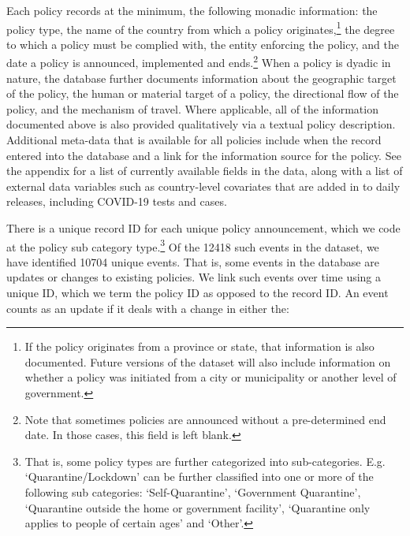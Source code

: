 \documentclass[
]{article}
\begin{document}
Each policy records at the minimum, the following monadic information: the policy type, the name of the country from which a policy originates,\footnote{If the policy originates from a province or state, that information is also documented. Future versions of the dataset will also include information on whether a policy was initiated from a city or municipality or another level of government.} the degree to which a policy must be complied with, the entity enforcing the policy, and the date a policy is announced, implemented and ends.\footnote{Note that sometimes policies are announced without a pre-determined end date. In those cases, this field is left blank.} When a policy is dyadic in nature, the database further documents information about the geographic target of the policy, the human or material target of a policy, the directional flow of the policy, and the mechanism of travel. Where applicable, all of the information documented above is also provided qualitatively via a textual policy description. Additional meta-data that is available for all policies include when the record entered into the database and a link for the information source for the policy. See the appendix for a list of currently available fields in the data, along with a list of external data variables such as country-level covariates that are added in to daily releases, including COVID-19 tests and cases.

There is a unique record ID for each unique policy announcement, which we code at the policy sub category type.\footnote{That is, some policy types are further categorized into sub-categories. E.g. `Quarantine/Lockdown' can be further classified into one or more of the following sub categories: `Self-Quarantine', `Government Quarantine', `Quarantine outside the home or government facility', `Quarantine only applies to people of certain ages' and `Other'.} Of the 12418 such events in the dataset, we have identified 10704 unique events. That is, some events in the database are updates or changes to existing policies. We link such events over time using a unique ID, which we term the policy ID as opposed to the record ID. An event counts as an update if it deals with a change in either the:
\end{document}
